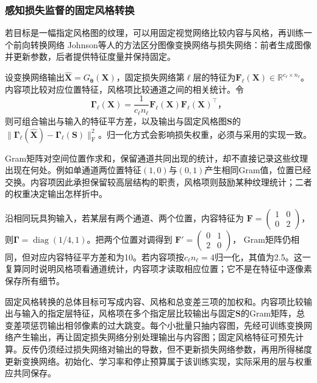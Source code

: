 \Needspace{45mm}
\subsubsection{感知损失监督的固定风格转换}
\label{sec:vision-generation-perceptual-style}

若目标是一幅指定风格图的纹理，可以用固定视觉网络比较内容与风格，再训练一个前向转换网络
Johnson等人的方法区分图像变换网络与损失网络：前者生成图像并更新参数，后者提供特征度量并保持固定。

设变换网络输出$\widehat{\bm{X}}=G_{\bm{\theta}}(\bm{X})$，固定损失网络第$\ell$层的特征为$\bm{F}_\ell(\bm{X})\in\mathbb{R}^{c_\ell\times n_\ell}$。内容项比较对应位置特征，风格项比较通道之间的相关统计。令
\begin{equation}
 \bm{\Gamma}_\ell(\bm{X})
 =\frac{1}{c_\ell n_\ell}
   \bm{F}_\ell(\bm{X})\bm{F}_\ell(\bm{X})^\top\text{，}
 \label{eq:vision-style-gram}
\end{equation}
则可组合输出与输入的特征平方差，以及输出与固定风格图$\bm{S}$的
$\lVert\bm{\Gamma}_\ell(\widehat{\bm{X}})-\bm{\Gamma}_\ell(\bm{S})\rVert_{\mathrm{F}}^2$。归一化方式会影响损失权重，必须与采用的实现一致。

Gram矩阵对空间位置作求和，保留通道共同出现的统计，却不直接记录这些纹理出现在何处。例如单通道两位置特征$(1,0)$与$(0,1)$产生相同Gram值，位置已经交换。内容项因此承担保留较高层结构的职责，风格项则鼓励某种纹理统计；二者的权重决定输出怎样折中。

沿相同玩具狗输入，若某层有两个通道、两个位置，内容特征为
$\bm{F}=\left(\begin{smallmatrix}1&0\\0&2\end{smallmatrix}\right)$，
则$\bm{\Gamma}=\operatorname{diag}(1/4,1)$。把两个位置对调得到
$\bm{F}'=\left(\begin{smallmatrix}0&1\\2&0\end{smallmatrix}\right)$，
Gram矩阵仍相同，但对应内容特征平方差和为10。若内容项按$c_\ell n_\ell=4$归一化，其值为2.5。这一复算同时说明风格项看通道统计，内容项才读取相应位置；它不是在特征中逐像素保存所有细节。

固定风格转换的总体目标可写成内容、风格和总变差三项的加权和。内容项比较输出与输入的指定层特征，风格项在多个指定层比较输出与固定$\bm{S}$的Gram矩阵，总变差项惩罚输出相邻像素的过大跳变。每个小批量只抽内容图，先经可训练变换网络产生输出，再让固定损失网络分别处理输出与内容图；固定风格特征可预先计算。反传仍须经过损失网络对输出的导数，但不更新损失网络参数，再用所得梯度更新变换网络。初始化、学习率和停止预算属于该训练实现，实际采用的层与权重应共同保存。

